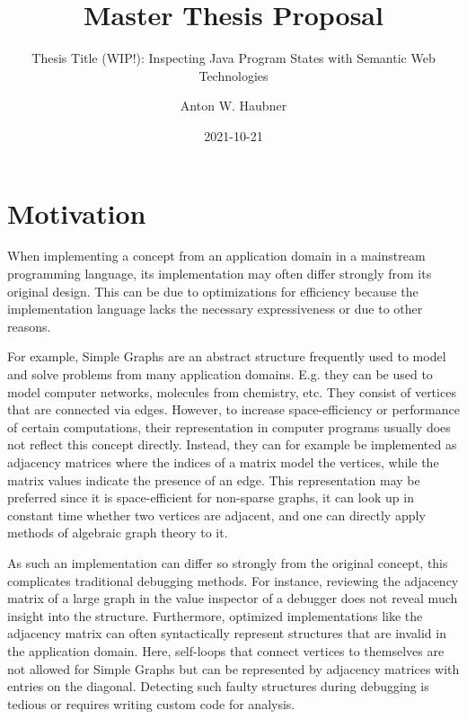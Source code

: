 \documentclass[
	english,
	accentcolor=9c,%
  marginpar=0cm %
	]{tudapub}
\begin{document}

\date{2021-10-21}
\title{Master Thesis Proposal}
\subtitle{Thesis Title (WIP!): Inspecting Java Program States with Semantic Web Technologies}
\author{Anton W. Haubner}

\titleimage{
	\color{black!30}\rule{\width}{\height}
}

\maketitle


\section{Motivation}

When implementing a concept from an application domain in a mainstream
programming language, its implementation may often differ strongly from its
original design.
This can be due to optimizations for efficiency because the implementation
language lacks the necessary expressiveness or due to other reasons.

For example, Simple Graphs are an abstract structure frequently used to model
and solve problems from many application domains.
E.g. they can be used to model computer networks, molecules from chemistry, etc.
%
They consist of vertices that are connected via edges.
However, to increase space-efficiency or performance of certain computations,
their representation in computer programs usually does not reflect this concept
directly.
Instead, they can for example be implemented as adjacency matrices where the
indices of a matrix model the vertices, while the matrix values indicate the
presence of an edge.
This representation may be preferred since it is space-efficient for non-sparse
graphs, it can look up in constant time whether two vertices are adjacent, and
one can directly apply methods of algebraic graph theory to it.

As such an implementation can differ so strongly from the original concept,
this complicates traditional debugging methods.
For instance, reviewing the adjacency matrix of a large graph in the value
inspector of a debugger does not reveal much insight into the structure.
%
Furthermore, optimized implementations like the adjacency matrix can often
syntactically represent structures that are invalid in the application domain.
Here, self-loops that connect vertices to themselves are not
allowed for Simple Graphs but can be represented by adjacency matrices with
entries on the diagonal.
Detecting such faulty structures during debugging is tedious or requires writing
custom code for analysis.
\end{document}
